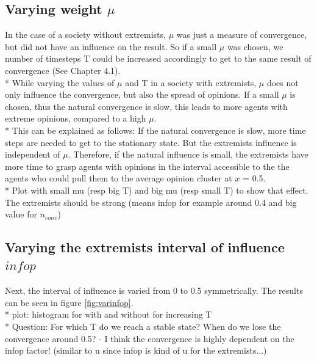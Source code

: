 \documentclass[11pt]{article}
\begin{document}
\subsection{Varying weight \texorpdfstring{$\mu$}{TEXT}}
In the case of a society without extremists, $\mu$ was just a measure of convergence, but did not have an influence on the result. So if a small $\mu$ was chosen, we number of timesteps T could be increased accordingly to get  to the same result of convergence (See Chapter 4.1). \\*
While varying the values of $\mu$ and T in a society with extremists, $\mu$ does not only influence the convergence, but also the spread of opinions. If a small $\mu$ is chosen, thus the natural convergence is slow, this leads to more agents with extreme opinions, compared to a high $\mu$. \\*
This can be explained as follows: If the natural convergence is slow, more time steps are needed to get to the stationary state. But the extremists influence is independent of $\mu$. Therefore, if the natural influence is small, the extremists have more time to grasp agents with opinions in the interval accessible to the the agents who could pull them to the average opinion cluster at $x$ = 0.5. \\*
Plot with small mu (resp big T) and big mu (resp small T) to show that effect. The extremists should be strong (means infop for example around 0.4 and big value for $n_{conv}$)

\subsection{Varying the extremists interval of influence \texorpdfstring{$infop$}{TEXT}}
Next, the interval of influence is varied from 0 to 0.5 symmetrically. The results can be seen in figure \ref{fig:varinfop}.\\*
plot: histogram for with and without for increasing T \\*
Question: For which T do we reach a stable state? When do we lose the convergence around 0.5? - I think the convergence is highly dependent on the infop factor! (similar to u since infop is kind of u for the extremists...)
\end{document}

